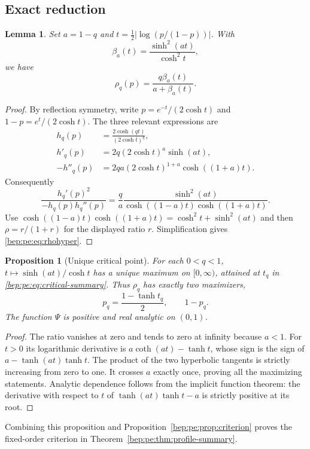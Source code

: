 \documentclass[11pt]{article}
\numberwithin{equation}{section}
\newtheorem{proposition}[theorem]{Proposition}
\newtheorem{lemma}[theorem]{Lemma}
\theoremstyle{definition}
\theoremstyle{remark}
\begin{document}
\subsection{Exact reduction}
\begin{lemma}\label{bep:pe:lem:hyperbolic}
Set $a=1-q$ and
$t=\tfrac12|\log(p/(1-p))|$. With
\begin{equation}
 \beta_a(t)=\frac{\sinh^2(at)}{\cosh^2t},
\end{equation}
we have
\begin{equation}
 \rho_q(p)=\frac{q\beta_a(t)}{a+\beta_a(t)}.\label{bep:pe:eq:rhohyper}
\end{equation}
\end{lemma}
\begin{proof}
By reflection symmetry, write
$p=e^{-t}/(2\cosh t)$ and $1-p=e^t/(2\cosh t)$. The three relevant
expressions are
\begin{align*}
 h_q(p)&=\frac{2\cosh(qt)}{(2\cosh t)^q},\\
 h'_q(p)&=2q(2\cosh t)^a\sinh(at),\\
 -h''_q(p)&=2qa(2\cosh t)^{1+a}\cosh((1+a)t).
\end{align*}
Consequently
\[
 \frac{h_q'(p)^2}{-h_q(p)h_q''(p)}
 =\frac qa\frac{\sinh^2(at)}{
 \cosh((1-a)t)\cosh((1+a)t)}.
\]
Use
$\cosh((1-a)t)\cosh((1+a)t)=\cosh^2t+\sinh^2(at)$
and then $\rho=r/(1+r)$ for the displayed ratio $r$. Simplification
gives \eqref{bep:pe:eq:rhohyper}.
\end{proof}

\begin{proposition}[Unique critical point]\label{bep:pe:prop:unique}
For each $0<q<1$, $t\mapsto\sinh(at)/\cosh t$ has a unique maximum
on $[0,\infty)$, attained at $t_q$ in
\eqref{bep:pe:eq:critical-summary}. Thus $\rho_q$ has exactly two maximizers,
\begin{equation}
 p_q=\frac{1-\tanh t_q}{2},\qquad 1-p_q.\label{bep:pe:eq:maximizers}
\end{equation}
The function $\Psi$ is positive and real analytic on $(0,1)$.
\end{proposition}
\begin{proof}
The ratio vanishes at zero and tends to zero at infinity because
$a<1$. For $t>0$ its logarithmic derivative is
$a\coth(at)-\tanh t$, whose sign is the sign of
$a-\tanh(at)\tanh t$. The product of the two hyperbolic tangents is
strictly increasing from zero to one. It crosses $a$ exactly once,
proving all the maximizing statements. Analytic dependence follows
from the implicit function theorem: the derivative with respect to $t$
of $\tanh(at)\tanh t-a$ is strictly positive at its root.
\end{proof}
Combining this proposition and Proposition~\ref{bep:pe:prop:criterion} proves
the fixed-order criterion in Theorem~\ref{bep:pe:thm:profile-summary}.
\end{document}
